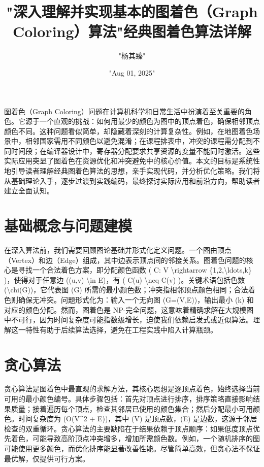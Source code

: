 \title{"深入理解并实现基本的图着色（Graph Coloring）算法"}
\author{"杨其臻"}
\date{"Aug 01, 2025"}
\maketitle
图着色（Graph Coloring）问题在计算机科学和日常生活中扮演着至关重要的角色。它源于一个直观的挑战：如何用最少的颜色为图中的顶点着色，确保相邻顶点颜色不同。这种问题看似简单，却隐藏着深刻的计算复杂性。例如，在地图着色场景中，相邻国家需用不同颜色以避免混淆；在课程排表中，冲突的课程需分配到不同时间段；在编译器设计中，寄存器分配要求共享资源的变量不能同时激活。这些实际应用突显了图着色在资源优化和冲突避免中的核心价值。本文的目标是系统性地引导读者理解经典图着色算法的思想，亲手实现代码，并分析优化策略。我们将从基础理论入手，逐步过渡到实践编码，最终探讨实际应用和前沿方向，帮助读者建立全面认知。\par
\chapter{基础概念与问题建模}
在深入算法前，我们需要回顾图论基础并形式化定义问题。一个图由顶点（Vertex）和边（Edge）组成，其中边表示顶点间的邻接关系。图着色问题的核心是寻找一个合法着色方案，即分配颜色函数 ( C: V \textbackslash{}rightarrow \{{}1,2,\textbackslash{}ldots,k\}{} )，使得对于任意边 ((u,v) \textbackslash{}in E)，有 ( C(u) \textbackslash{}neq C(v) )。关键术语包括色数 (\textbackslash{}chi(G))，它代表图 (G) 所需的最小颜色数；冲突指相邻顶点颜色相同；合法着色则确保无冲突。问题形式化为：输入一个无向图 (G=(V,E))，输出最小 (k) 和对应的颜色分配。然而，图着色是 NP-完全问题，这意味着精确求解在大规模图中不可行，因为时间复杂度可能指数级增长，迫使我们依赖启发式或近似算法。理解这一特性有助于后续算法选择，避免在工程实践中陷入计算瓶颈。\par
\title{经典图着色算法详解}
\chapter{贪心算法}
贪心算法是图着色中最直观的求解方法，其核心思想是逐顶点着色，始终选择当前可用的最小颜色编号。具体步骤包括：首先对顶点进行排序，排序策略直接影响结果质量；接着遍历每个顶点，检查其邻居已使用的颜色集合；然后分配最小可用颜色。时间复杂度为 (O(V\^{}2 + E))，其中 (V) 是顶点数，(E) 是边数，这源于邻居检查的双重循环。贪心算法的主要缺陷在于结果依赖于顶点顺序：如果低度顶点优先着色，可能导致高阶顶点冲突增多，增加所需颜色数。例如，一个随机排序的图可能使用更多颜色，而优化排序能显著改善性能。尽管简单高效，但贪心法不保证最优解，仅提供可行方案。\par
